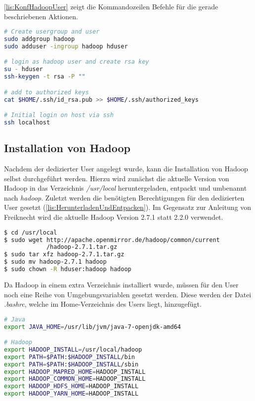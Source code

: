 \autoref{lis:KonfHadoopUser} zeigt die Kommandozeilen Befehle für die gerade beschriebenen Aktionen. \\

\begin{lstlisting}[language=bash, caption={Konfiguration des Hadoop Users}, label=lis:KonfHadoopUser]
# Create usergroup and user
sudo addgroup hadoop
sudo adduser -ingroup hadoop hduser

# login as hadoop user and create rsa key
su - hduser
ssh-keygen -t rsa -P ""

# add to authorized keys
cat $HOME/.ssh/id_rsa.pub >> $HOME/.ssh/authorized_keys

# Initial login on host via ssh
ssh localhost
\end{lstlisting}

\subsection{Installation von Hadoop}
Nachdem der dedizierter User angelegt wurde, kann die Installation von Hadoop selbst durchgeführt werden. Hierzu wird zunächst die aktuelle Version von Hadoop in das Verzeichnis \textit{/usr/local} heruntergeladen, entpackt und umbenannt nach \textit{hadoop}. Zuletzt werden die benötigten Berechtigungen für den dedizierten User gesetzt (\autoref{lis:HerunterladenUndEntpacken}). Im Gegensatz zur Anleitung von Freiknecht wird die aktuelle Hadoop Version 2.7.1 statt 2.2.0 verwendet. \\

\begin{lstlisting}[language=bash, caption={Herunterladen und entpacke von Hadoop}, label=lis:HerunterladenUndEntpacken]
$ cd /usr/local
$ sudo wget http://apache.openmirror.de/hadoop/common/current
            /hadoop-2.7.1.tar.gz
$ sudo tar xfz hadoop-2.7.1.tar.gz
$ sudo mv hadoop-2.7.1 hadoop
$ sudo chown -R hduser:hadoop hadoop
\end{lstlisting}

Da Hadoop in einem extra Verzeichnis installiert wurde, müssen für den User noch eine Reihe von Umgebungsvariablen gesetzt werden. Diese werden der Datei \textit{.bashrc}, welche im Home-Verzeichnis des Users liegt, hinzugefügt. \\

\begin{lstlisting}[language=bash, caption={Umgebungsvariablen für Hadoop}, label=lis:Umgebungsvariablen]
# Java
export JAVA_HOME=/usr/lib/jvm/java-7-openjdk-amd64

# Hadoop
export HADOOP_INSTALL=/usr/local/hadoop
export PATH=$PATH:$HADOOP_INSTALL/bin
export PATH=$PATH:$HADOOP_INSTALL/sbin
export HADOOP_MAPRED_HOME=HADOOP_INSTALL
export HADOOP_COMMON_HOME=HADOOP_INSTALL
export HADOOP_HDFS_HOME=HADOOP_INSTALL
export HADOOP_YARN_HOME=HADOOP_INSTALL
\end{lstlisting}

